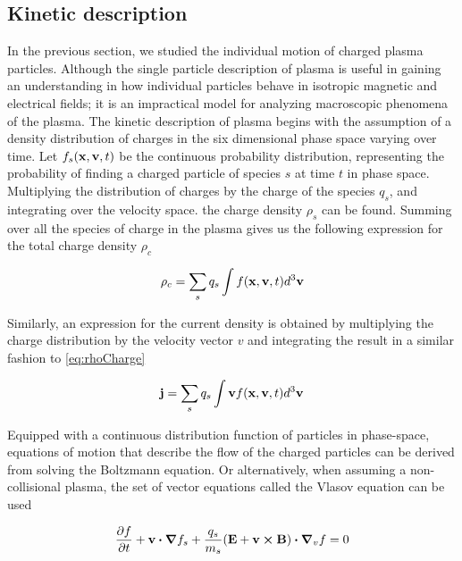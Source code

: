 \subsection{Kinetic description}
In the previous section, we studied the individual motion of charged plasma particles. Although the single particle description of plasma is useful in gaining an understanding in how individual particles behave in isotropic magnetic and electrical fields; it is an impractical model for analyzing macroscopic phenomena of the plasma.  The kinetic description of plasma begins with the assumption of a density distribution of charges in the six dimensional phase space varying over time. Let $f_s(\vb{x}, \vb{v}, t)$ be the continuous probability distribution, representing the probability of finding a charged particle of species $s$ at time $t$ in phase space. Multiplying the distribution of charges by the charge of the species $q_s$, and integrating over the velocity space. the charge density $\rho_s$ can be found. Summing over all the species of charge in the plasma gives us the following expression for the total charge density $\rho_c$

\begin{equation}\label{eq:rhoCharge}
    \rho_c = \sum_s q_s\int f(\vb{x}, \vb{v}, t) d^3\vb{v}
\end{equation}

Similarly, an expression for the current density is obtained by multiplying the charge distribution by the velocity vector $v$ and integrating the result in a similar fashion to \ref{eq:rhoCharge}

\begin{equation}
    \vb{j} = \sum_s q_s \int \vb{v} f(\vb{x}, \vb{v}, t) d^3 \vb{v}
\end{equation}


Equipped with a continuous distribution function of particles in phase-space, equations of motion that describe the flow of the charged particles can be derived from solving the Boltzmann equation. Or alternatively, when assuming a non-collisional plasma, the set of vector equations called the Vlasov equation can be used


\begin{equation}\label{eq:Vlasov}
    \pdv{f}{t} + \vb{v} \vdot \grad{f_s} + \frac{q_s}{m_s} (\vb{E} + \vb{v} \cp \vb{B}) \vdot \grad_v{f} = 0
\end{equation}

